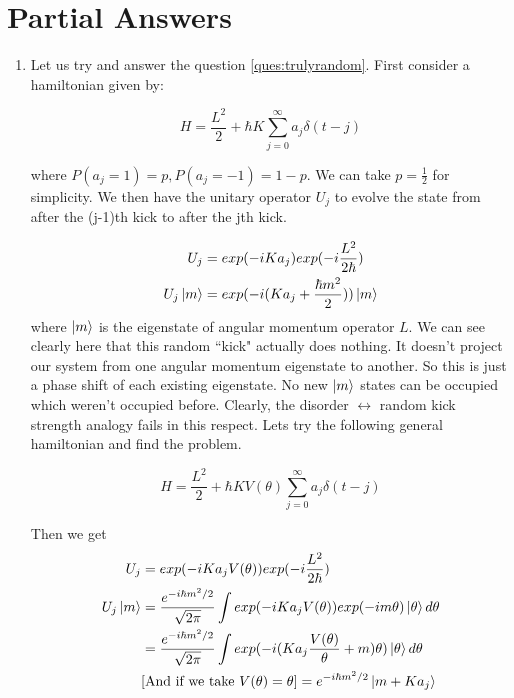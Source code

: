 \documentclass[12pt]{article}
\begin{document}
\section{Partial Answers}
\begin{enumerate}
    \item Let us try and answer the question \ref{ques:trulyrandom}. First consider a hamiltonian given by:

    \begin{equation}
        H = \frac{L^2}{2} + \hbar K \sum_{j=0}^{\infty} a_j \delta(t - j)
    \end{equation}

    where $P(a_j = 1) = p, P(a_j = -1) = 1 - p$. We can take $p = \frac{1}{2}$ for simplicity. We then have
    the unitary operator $U_j$ to evolve the state from after the (j-1)th kick to after the jth kick.
    
    \begin{align}
        U_j &= exp(-iKa_j) exp(-i\frac{L^2}{2\hbar}) \\
        U_j \ket{m} &= exp(-i (Ka_j + \frac{\hbar m^2}{2})) \ket{m}	
    \end{align}
    where $\ket{m}$ is the eigenstate of angular momentum operator $L$. We can see clearly here that this
    random ``kick" actually does nothing. It doesn't project our system from one angular momentum eigenstate
    to another. So this is just a phase shift of each existing eigenstate. No new $\ket{m}$ states can be
    occupied which weren't occupied before. Clearly, the disorder $\leftrightarrow$ random kick strength
    analogy fails in this respect. Lets try the following general hamiltonian and find the problem.

    \begin{equation}
        H = \frac{L^2}{2} + \hbar K V(\theta) \sum_{j=0}^{\infty} a_j \delta(t - j)
    \end{equation}
    
    Then we get
    \begin{align}
        U_j &= exp(-iKa_jV(\theta)) exp(-i\frac{L^2}{2\hbar}) \\
        U_j \ket{m} &= 	\frac{e^{-i \hbar m^2/2}}{\sqrt{2\pi}} \int exp(-iKa_jV(\theta)) exp(-im\theta) \ket{\theta} d\theta \\
        &= 	\frac{e^{-i \hbar m^2/2}}{\sqrt{2\pi}} \int exp(-i(Ka_j\frac{V(\theta)}{\theta} + m)\theta) \ket{\theta} d\theta \\
        &[\text{And if we take } V(\theta) = \theta] = e^{-i \hbar m^2/2} \ket{m + Ka_j}
    \end{align}
    

\end{enumerate}
\end{document}
